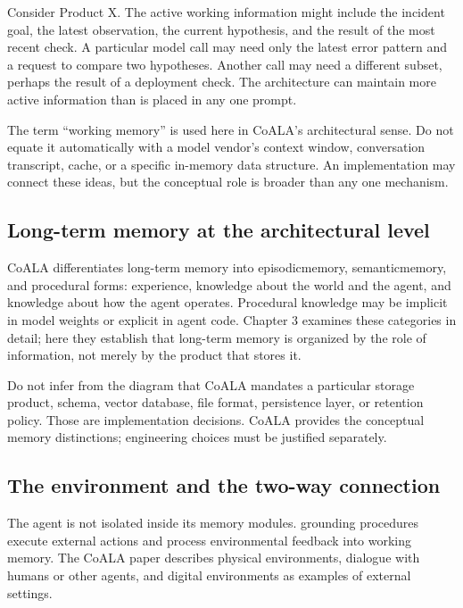 Consider Product X. The active working information might include the incident goal, the latest observation, the current hypothesis, and the result of the most recent check. A particular model call may need only the latest error pattern and a request to compare two hypotheses. Another call may need a different subset, perhaps the result of a deployment check. The architecture can maintain more active information than is placed in any one prompt.

\begin{notebox}
The term “working memory” is used here in CoALA's architectural sense. Do not equate it automatically with a model vendor's context window, conversation transcript, cache, or a specific in-memory data structure. An implementation may connect these ideas, but the conceptual role is broader than any one mechanism.
\end{notebox}

\subsection{Long-term memory at the architectural level}

CoALA differentiates long-term memory into \gls{episodicmemory}, \gls{semanticmemory}, and procedural forms: experience, knowledge about the world and the agent, and knowledge about how the agent operates. Procedural knowledge may be implicit in model weights or explicit in agent code. Chapter 3 examines these categories in detail; here they establish that long-term memory is organized by the role of information, not merely by the product that stores it.

\begin{warningbox}
Do not infer from the diagram that CoALA mandates a particular storage product, schema, vector database, file format, persistence layer, or retention policy. Those are implementation decisions. CoALA provides the conceptual memory distinctions; engineering choices must be justified separately.
\end{warningbox}

\subsection{The environment and the two-way connection}

The agent is not isolated inside its memory modules. \Gls{grounding} procedures execute external actions and process environmental feedback into working memory. The CoALA paper describes physical environments, dialogue with humans or other agents, and digital environments as examples of external settings.


